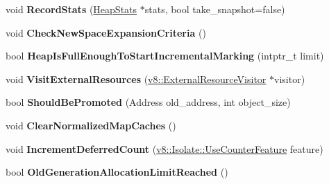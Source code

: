 \begin{DoxyCompactItemize}
\item 
void {\bfseries Record\+Stats} (\hyperlink{classv8_1_1internal_1_1_heap_stats}{Heap\+Stats} $\ast$stats, bool take\+\_\+snapshot=false)\hypertarget{classv8_1_1internal_1_1_heap_aade3e6bd0abbe091c12e9c9ac35ee6af}{}\label{classv8_1_1internal_1_1_heap_aade3e6bd0abbe091c12e9c9ac35ee6af}

\item 
void {\bfseries Check\+New\+Space\+Expansion\+Criteria} ()\hypertarget{classv8_1_1internal_1_1_heap_a432276c83ffc010c9d21b3ae4ab8ec1b}{}\label{classv8_1_1internal_1_1_heap_a432276c83ffc010c9d21b3ae4ab8ec1b}

\item 
bool {\bfseries Heap\+Is\+Full\+Enough\+To\+Start\+Incremental\+Marking} (intptr\+\_\+t limit)\hypertarget{classv8_1_1internal_1_1_heap_a86d3935cc7cedbaa33262cf259fa97ab}{}\label{classv8_1_1internal_1_1_heap_a86d3935cc7cedbaa33262cf259fa97ab}

\item 
void {\bfseries Visit\+External\+Resources} (\hyperlink{classv8_1_1_external_resource_visitor}{v8\+::\+External\+Resource\+Visitor} $\ast$visitor)\hypertarget{classv8_1_1internal_1_1_heap_a1114f7d55a1658f321e1aaebc34ee3f4}{}\label{classv8_1_1internal_1_1_heap_a1114f7d55a1658f321e1aaebc34ee3f4}

\item 
bool {\bfseries Should\+Be\+Promoted} (Address old\+\_\+address, int object\+\_\+size)\hypertarget{classv8_1_1internal_1_1_heap_ac220b3da119fd1783a1636f86bc12ab6}{}\label{classv8_1_1internal_1_1_heap_ac220b3da119fd1783a1636f86bc12ab6}

\item 
void {\bfseries Clear\+Normalized\+Map\+Caches} ()\hypertarget{classv8_1_1internal_1_1_heap_ad1df96ba9d9708cfaf94aad453d84962}{}\label{classv8_1_1internal_1_1_heap_ad1df96ba9d9708cfaf94aad453d84962}

\item 
void {\bfseries Increment\+Deferred\+Count} (\hyperlink{classv8_1_1_isolate_aed6909379c3f2820cb3084710b73385d}{v8\+::\+Isolate\+::\+Use\+Counter\+Feature} feature)\hypertarget{classv8_1_1internal_1_1_heap_a1f23e013cea83a3fdcf17b9019c811e1}{}\label{classv8_1_1internal_1_1_heap_a1f23e013cea83a3fdcf17b9019c811e1}

\item 
bool {\bfseries Old\+Generation\+Allocation\+Limit\+Reached} ()\hypertarget{classv8_1_1internal_1_1_heap_a1f66fc8db47e583220fa17450eeee1e6}{}\label{classv8_1_1internal_1_1_heap_a1f66fc8db47e583220fa17450eeee1e6}


\end{DoxyCompactItemize}
